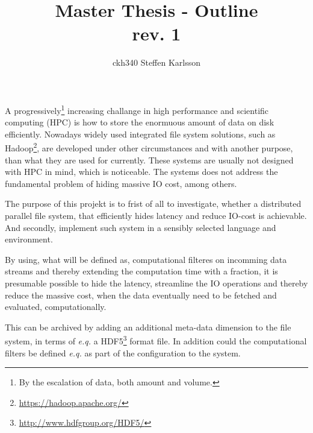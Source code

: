 \documentclass[12pt,a4paper]{article}
\author{ckh340 Steffen Karlsson}
\title{Master Thesis - Outline \\ \small{rev. 1}}
\begin{document}
\maketitle

A progressively\footnote{By the escalation of data, both amount and volume.} increasing challange in high performance and scientific computing (HPC) is how to store the enormuous amount of data on disk efficiently. Nowadays widely used integrated file system solutions, such as Hadoop\footnote{\url{https://hadoop.apache.org/}}, are developed under other circumstances and with another purpose, than what they are used for currently. These systems are usually not designed with HPC in mind, which is noticeable. The systems does not address the fundamental problem of hiding massive IO cost, among others.
\newline

The purpose of this projekt is to frist of all to investigate, whether a distributed parallel file system, that efficiently hides latency and reduce IO-cost is achievable. And secondly, implement such system in a sensibly selected language and environment. 
\newline

By using, what will be defined as, computational filteres on incomming data streams and thereby extending the computation time with a fraction, it is presumable possible to hide the latency, streamline the IO operations and thereby reduce the massive cost, when the data eventually need to be fetched and evaluated, computationally. 

This can be archived by adding an additional meta-data dimension to the file system, in terms of \textit{e.q.} a HDF5\footnote{\url{http://www.hdfgroup.org/HDF5/}} format file. In addition could the computational filters be defined \textit{e.q.} as part of the configuration to the system.
\end{document}

